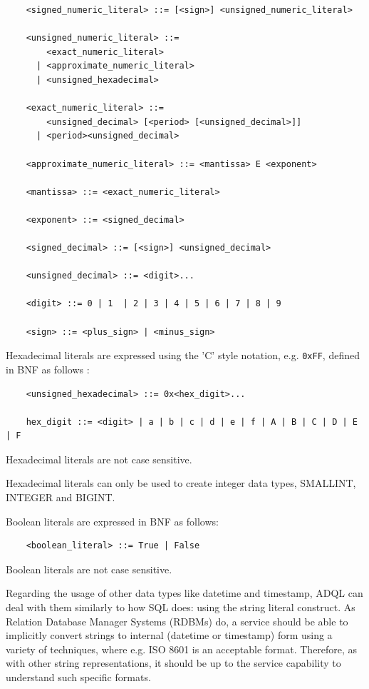 \documentclass[11pt,a4paper]{ivoa}
\begin{document}
\begin{verbatim}
    <signed_numeric_literal> ::= [<sign>] <unsigned_numeric_literal>

    <unsigned_numeric_literal> ::= 
        <exact_numeric_literal>
      | <approximate_numeric_literal>
      | <unsigned_hexadecimal>
              
    <exact_numeric_literal> ::=
        <unsigned_decimal> [<period> [<unsigned_decimal>]]
      | <period><unsigned_decimal>

    <approximate_numeric_literal> ::= <mantissa> E <exponent>

    <mantissa> ::= <exact_numeric_literal>

    <exponent> ::= <signed_decimal>

    <signed_decimal> ::= [<sign>] <unsigned_decimal>

    <unsigned_decimal> ::= <digit>...

    <digit> ::= 0 | 1  | 2 | 3 | 4 | 5 | 6 | 7 | 8 | 9
    
    <sign> ::= <plus_sign> | <minus_sign>
\end{verbatim}

Hexadecimal literals are expressed using the 'C' style notation, e.g. \verb:0xFF:,
defined in BNF as follows :
\begin{verbatim}
    <unsigned_hexadecimal> ::= 0x<hex_digit>...

    hex_digit ::= <digit> | a | b | c | d | e | f | A | B | C | D | E | F
\end{verbatim}

Hexadecimal literals are not case sensitive.

Hexadecimal literals can only be used to create integer data types, SMALLINT, INTEGER and BIGINT.

Boolean literals are expressed in BNF as follows:

\begin{verbatim}
    <boolean_literal> ::= True | False
\end{verbatim}

Boolean literals are not case sensitive.

Regarding the usage of other data types like datetime and timestamp, ADQL
can deal with them similarly to how SQL does: using the string literal
construct. As Relation Database Manager Systems (RDBMs) do, a service should
be able to implicitly convert strings to internal (datetime or timestamp)
form using a variety of techniques, where e.g. ISO 8601 is an acceptable
format. Therefore, as with other string representations, it should be up to
the service capability to understand such specific formats.
\end{document}

